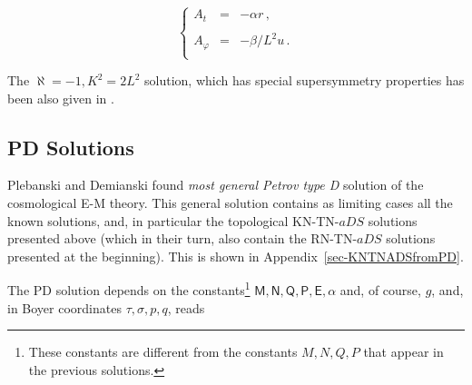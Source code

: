 \documentclass[12pt,a4paper]{article}
\begin{document}
\begin{equation}
\left\{
\begin{array}{rcl}
A_{t} & = & -\alpha r\, ,\\
& & \\
A_{\varphi} & = & -\beta/L^{2} u\, .\\
\end{array}
\right.
\end{equation}

The $\aleph=-1, K^{2}=2L^{2}$ solution, which has special
supersymmetry properties has been also given in \cite{kn:CKZ}.


\subsection{PD Solutions}

Plebanski and Demianski found {\it most general Petrov type D}
solution of the cosmological E-M theory. This general solution
contains as limiting cases all the known solutions, and, in particular
the topological KN-TN-$aDS$ solutions presented above (which in their
turn, also contain the RN-TN-$aDS$ solutions presented at the
beginning). This is shown in Appendix~\ref{sec-KNTNADSfromPD}.

The PD solution depends on the constants\footnote{These constants are
  different from the constants $M,N,Q,P$ that appear in the previous
  solutions.}
$\mathsf{M},\mathsf{N},\mathsf{Q},\mathsf{P},\mathsf{E},\alpha$ and,
of course, $g$, and, in Boyer coordinates $\tau,\sigma,p,q$, reads
\cite{art:PD}

%
%
%
%
\end{document}
